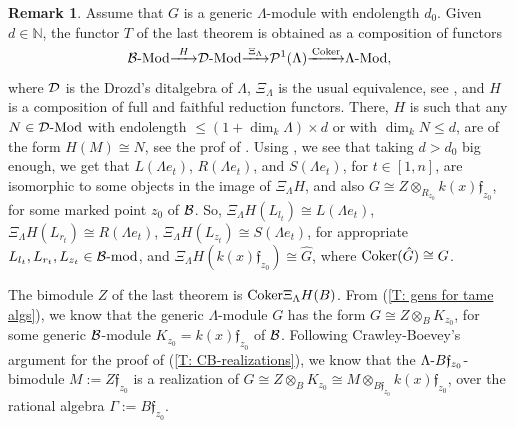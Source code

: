 \documentclass{article}
\theoremstyle{definition}
\newtheorem{remark}[theorem]{Remark}
\newcommand{\Coker}{{ \rm Coker }}
\newcommand{\Mod}{{ \rm Mod }}
\renewcommand{\frak}{\mathfrak}
\newcommand{\g}{\hbox{-}}
\newcommand{\hueca}[1]{\mathbb{#1}}
\renewcommand{\mod}{{\rm mod }}
\newcommand{\rightmap}[1]{\smash{\mathop{\hbox to 
20pt{\rightarrowfill}}\limits^{#1}}}
\begin{document}
\begin{remark}\label{R: first choice of min ditalg} Assume that $G$ is a  generic $\Lambda$-module  with endolength $d_0$. Given $d\in \hueca{N}$, the functor $T$ of the last theorem is obtained as a composition of functors 
$${\cal B}\g\Mod\rightmap{H}{\cal D}\g\Mod\rightmap{\Xi_\Lambda}{\cal P}^1(\Lambda)\rightmap{ \ \Coker \ }\Lambda\g\Mod,$$
where ${\cal D}$ is the Drozd's ditalgebra of $\Lambda$,  $\Xi_\Lambda$ is the usual equivalence, see \cite[\S19]{BSZ}, and $H$ is a composition of  full and faithful reduction functors. There, $H$ is such that any $N\in {\cal D}\g\Mod$ with endolength $\leq (1+\dim_k\Lambda)\times d$ or with $\dim_kN\leq d$, are of the form $H(M)\cong N$, see the prof of \cite[(29.9)]{BSZ}. Using \cite[(29.5)]{BSZ}, we see that taking $d>d_0$ big enough, we get that $L(\Lambda e_t)$,  $R(\Lambda e_t)$, and $S(\Lambda e_t)$, for $t\in [1,n]$,  are isomorphic to some objects in the image of $\Xi_\Lambda H$, and also $G\cong Z\otimes_{R_{z_0}} k(x)\frak{f}_{z_0}$, for some marked point $z_0$ of ${\cal B}$.  So, $\Xi_\Lambda H(L_{l_t})\cong L(\Lambda e_t)$, $\Xi_\Lambda H(L_{r_t})\cong R(\Lambda e_t)$, $\Xi_\Lambda H(L_{z_t})\cong S(\Lambda e_t)$, for appropriate $L_{l_t}, L_{r_t}, L_{z_t}\in {\cal B}\g\mod$, and $\Xi_\Lambda H(k(x)\frak{f}_{z_0})\cong \hat{G}$, where $\Coker (\hat{G})\cong G$. 

The bimodule $Z$ of the last theorem is $\Coker\Xi_\Lambda H(B)$. 
From (\ref{T: gens for tame algs}), we know that the generic $\Lambda$-module $G$ has the form $G\cong Z\otimes_BK_{z_0}$, for some generic ${\cal B}$-module $K_{z_0}=k(x)\frak{f}_{z_0}$ of ${\cal B}$. Following Crawley-Boevey's argument for the proof of (\ref{T: CB-realizations}), we know that the $\Lambda\g B\frak{f}_{z_0}$-bimodule $M:=Z\frak{f}_{z_0}$ is a realization  of $G\cong Z\otimes_BK_{z_0}\cong M\otimes_{B\frak{f}_{z_0}}k(x)\frak{f}_{z_0}$, over the rational algebra $\Gamma:=B\frak{f}_{z_0}$. 
\end{remark}
\end{document}
